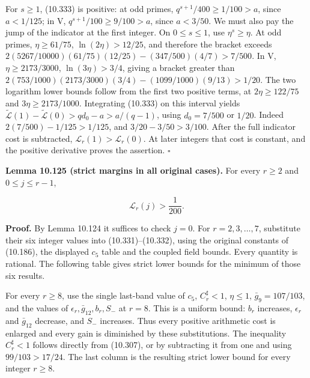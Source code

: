 \documentclass[
  11pt,
  a4paper,
]{article}
\begin{document}
For \(s\ge1\), (10.333) is positive: at odd primes,
\(q^{s+1}/400\ge1/100>a\), since \(a<1/125\); in V,
\(q^{s+1}/100\ge9/100>a\), since \(a<3/50\). We must also pay the jump
of the indicator at the first integer. On \(0\le s\le1\), use
\(\eta^s\ge\eta\). At odd primes, \(\eta\ge61/75\),
\(\ln(2\eta)>12/25\), and therefore the bracket exceeds
\(2(5267/10000)(61/75)(12/25)-(347/500)(4/7)>7/500\). In V,
\(\eta\ge2173/3000\), \(\ln(3\eta)>3/4\), giving a bracket greater than
\(2(753/1000)(2173/3000)(3/4)-(1099/1000)(9/13)>1/20\). The two
logarithm lower bounds follow from the first two positive terms, at
\(2\eta\ge122/75\) and \(3\eta\ge2173/1000\). Integrating (10.333) on
this interval yields
\(\widetilde{\mathcal L}(1)-\widetilde{\mathcal L}(0)>q d_0-a>a/(q-1)\),
using \(d_0=7/500\) or \(1/20\). Indeed \(2(7/500)-1/125>1/125\), and
\(3/20-3/50>3/100\). After the full indicator cost is subtracted,
\(\mathcal L_r(1)>\mathcal L_r(0)\). At later integers that cost is
constant, and the positive derivative proves the assertion. \(\square\)

\textbf{Lemma 10.125 (strict margins in all original cases).} For every
\(r\ge2\) and \(0\le j\le r-1\),

\[
\mathcal L_r(j)>\frac1{200}.
\tag{10.334}
\]

\textbf{Proof.} By Lemma 10.124 it suffices to check \(j=0\). For
\(r=2,3,\ldots,7\), substitute their six integer values into
(10.331)--(10.332), using the original constants of (10.186), the
displayed \(c_5\) table and the coupled field bounds. Every quantity is
rational. The following table gives strict lower bounds for the minimum
of those six results.

For every \(r\ge8\), use the single last-band value of \(c_5\),
\(C_r^{\sharp}<1\), \(\eta\le1\), \(\bar g_9=107/103\), and the values
of \(\epsilon_r,\bar g_{12},b_r,S_-\) at \(r=8\). This is a uniform
bound: \(b_r\) increases, \(\epsilon_r\) and \(\bar g_{12}\) decrease,
and \(S_-\) increases. Thus every positive arithmetic cost is enlarged
and every gain is diminished by these substitutions. The inequality
\(C_r^{\sharp}<1\) follows directly from (10.307), or by subtracting it
from one and using \(99/103>17/24\). The last column is the resulting
strict lower bound for every integer \(r\ge8\).
\end{document}
